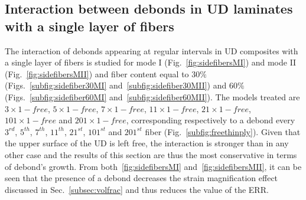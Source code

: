 \documentclass[review]{elsarticle}
\begin{document}
\subsection{Interaction between debonds in UD laminates with a single layer of fibers}\label{subsec:singlefiberud}

The interaction of debonds appearing at regular intervals in UD composites with a single layer of fibers is studied for mode I (Fig.~\ref{fig:sidefibersMI}) and mode II (Fig.~\ref{fig:sidefibersMII}) and fiber content equal to $30\%$ (Figs.~\ref{subfig:sidefiber30MI} and~\ref{subfig:sidefiber30MII}) and $60\%$ (Figs.~\ref{subfig:sidefiber60MI} and~\ref{subfig:sidefiber60MII}). The models treated are $3\times 1-free$, $5\times 1-free$, $7\times 1-free$, $11\times 1-free$, $21\times 1-free$, $101\times 1-free$ and $201\times 1-free$, corresponding respectively to a debond every $3^{rd}$, $5^{th}$, $7^{th}$, $11^{th}$, $21^{st}$, $101^{st}$ and $201^{st}$ fiber (Fig.~\ref{subfig:freethinply}). Given that the upper surface of the UD is left free, the interaction is stronger than in any other case and the results of this section are thus the most conservative in terms of debond's growth. From both~\ref{fig:sidefibersMI} and~\ref{fig:sidefibersMII}, it can be seen that the presence of a debond decreases the strain magnification effect discussed in Sec.~\ref{subsec:volfrac} and thus reduces the value of the ERR. 
\end{document}
